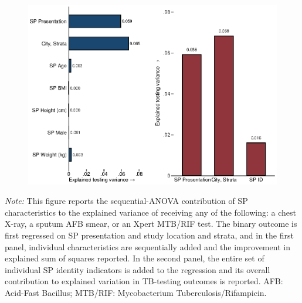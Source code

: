 \documentclass[fleqn,10pt]{wlscirep}
\begin{document}
\begin{figure}[h]
\centering
\includegraphics[width=1\textwidth]{f5.eps}
\end{figure}

\noindent\textit{Note:} This figure reports the sequential-ANOVA contribution of SP characteristics to the explained variance of receiving any of the following: a chest X-ray, a sputum AFB smear, or an Xpert MTB/RIF test. The binary outcome is first regressed on SP presentation and study location and strata, and in the first panel, individual characteristics are sequentially added and the improvement in explained sum of squares reported. In the second panel, the entire set of individual SP identity indicators is added to the regression and its overall contribution to explained variation in TB-testing outcomes is reported. AFB: Acid-Fast Bacillus; MTB/RIF: Mycobacterium Tuberculosis/Rifampicin.
\end{document}
